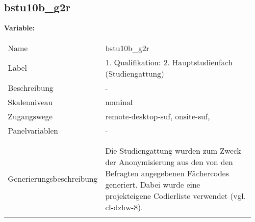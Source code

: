 	
	
	\subsection{bstu10b\_g2r}
	\label{subSection:bstu10b_g2r}

	\noindent\textbf{Variable:}\\
		\begin{tabular}{lL{11.3cm}}
			\label{tableVariable:bstu10b_g2r}
			Name & bstu10b\_g2r \\
			Label & 1. Qualifikation: 2. Hauptstudienfach (Studiengattung) \\
			Beschreibung & - \\
			Skalenniveau & nominal \\
			Zugangswege &
				remote-desktop-suf,
				onsite-suf,
 \\
			Panelvariablen & -
			 \\
			 \\
 \\
					Generierungsbeschreibung & Die Studiengattung wurden zum Zweck der Anonymisierung aus den von den Befragten angegebenen Fächercodes generiert.  Dabei wurde eine projekteigene Codierliste verwendet (vgl. cl-dzhw-8).
				 \\	
			 \\
		\end{tabular}






